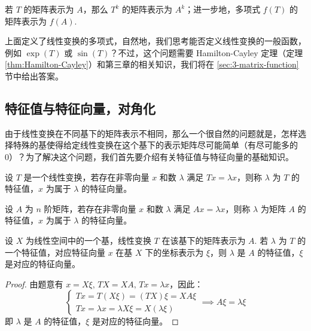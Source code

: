 \begin{theorem}[线性变换的多项式的矩阵表示]
若 $T$ 的矩阵表示为 $A$，那么 $T^k$ 的矩阵表示为 $A^k$；进一步地，多项式 $f(T)$ 的矩阵表示为 $f(A)$.
\end{theorem}

\begin{com}
上面定义了线性变换的多项式，自然地，我们思考能否定义线性变换的一般函数，例如 $\exp(T)$ 或 $\sin(T)$？不过，这个问题需要 Hamilton-Cayley 定理（定理 \ref{thm:Hamilton-Cayley}）和第三章的相关知识，我们将在 \ref{sec:3-matrix-function} 节中给出答案。
\end{com}


\subsection{特征值与特征向量，对角化}

由于线性变换在不同基下的矩阵表示不相同，那么一个很自然的问题就是，怎样选择特殊的基使得给定线性变换在这个基下的表示矩阵尽可能简单（有尽可能多的 0）？为了解决这个问题，我们首先要介绍有关特征值与特征向量的基础知识。

\begin{definition}[线性变换的特征值与特征向量]
设 $T$ 是一个线性变换，若存在非零向量 $x$ 和数 $\lambda$ 满足 $Tx=\lambda x$，则称 $\lambda$ 为 $T$ 的特征值，$x$ 为属于 $\lambda$ 的特征向量。
\end{definition}

\begin{definition}[矩阵的特征值与特征向量]
设 $A$ 为 $n$ 阶矩阵，若存在非零向量 $x$ 和数 $\lambda$ 满足 $Ax=\lambda x$，则称 $\lambda$ 为矩阵 $A$ 的特征值，$x$ 为属于 $\lambda$ 的特征向量。
\end{definition}

\begin{theorem}[线性变换的特征值和特征向量与矩阵的特征值和特征向量]
\label{thm:eigen-transform-matrix}
设 $X$ 为线性空间中的一个基，线性变换 $T$ 在该基下的矩阵表示为 $A$. 若 $\lambda$ 为 $T$ 的一个特征值，对应特征向量 $x$ 在基 $X$ 下的坐标表示为 $\xi$，则 $\lambda$ 是 $A$ 的特征值，$\xi$ 是对应的特征向量。
\end{theorem}
\begin{proof}
由题意有 $x=X\xi,\,TX=XA,\,Tx=\lambda x$，因此：
\[
    \begin{cases}
    Tx=T(X\xi)=(TX)\xi=XA\xi\\
    Tx=\lambda x=\lambda X\xi=X(\lambda\xi)
    \end{cases}\implies A\xi=\lambda\xi
\]
即 $\lambda$ 是 $A$ 的特征值，$\xi$ 是对应的特征向量。
\end{proof}

